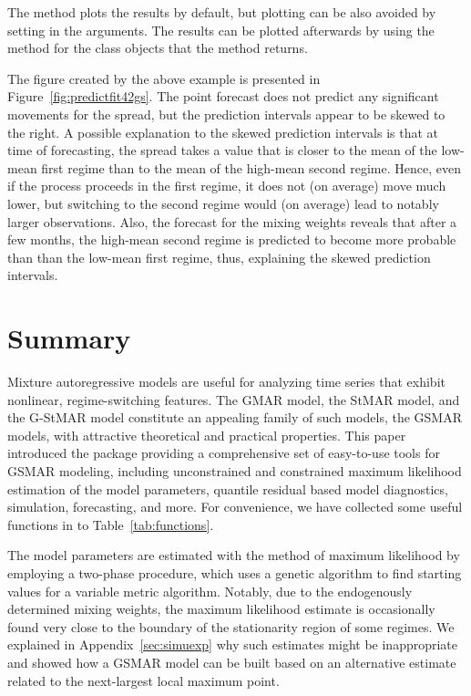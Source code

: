 \documentclass[nojss]{jss} %
\begin{document}
The  method plots the results by default, but plotting can be also avoided by setting  in the arguments. The results can be plotted afterwards by using the  method for the class  objects that the  method returns.

The figure created by the above example is presented in Figure~\ref{fig:predictfit42gs}. The point forecast does not predict any significant movements for the spread, but the prediction intervals appear to be skewed to the right. A possible explanation to the skewed prediction intervals is that at time of forecasting, the spread takes a value that is closer to the mean of the low-mean first regime than to the mean of the high-mean second regime. Hence, even if the process proceeds in the first regime, it does not (on average) move much lower, but switching to the second regime would (on average) lead to notably larger observations. Also, the forecast for the mixing weights reveals that after a few months, the high-mean second regime is predicted to become more probable than than the low-mean first regime, thus, explaining the skewed prediction intervals.


\section{Summary}\label{sec:summary}

Mixture autoregressive models are useful for analyzing time series that exhibit nonlinear, regime-switching features. The GMAR model, the StMAR model, and the G-StMAR model constitute an appealing family of such models, the GSMAR models, with attractive theoretical and practical properties. This paper introduced the  package  providing a comprehensive set of easy-to-use tools for GSMAR modeling, including unconstrained and constrained maximum likelihood estimation of the model parameters, quantile residual based model diagnostics, simulation, forecasting, and more. For convenience, we have collected some useful functions in  to Table~\ref{tab:functions}.

The model parameters are estimated with the method of maximum likelihood by employing a two-phase procedure, which uses a genetic algorithm to find starting values for a variable metric algorithm. Notably, due to the endogenously determined mixing weights, the maximum likelihood estimate is occasionally found very close to the boundary of the stationarity region of some regimes. We explained in Appendix~\ref{sec:simuexp} why such estimates might be inappropriate and showed how a GSMAR model can be built based on an alternative estimate related to the next-largest local maximum point.
\end{document}
